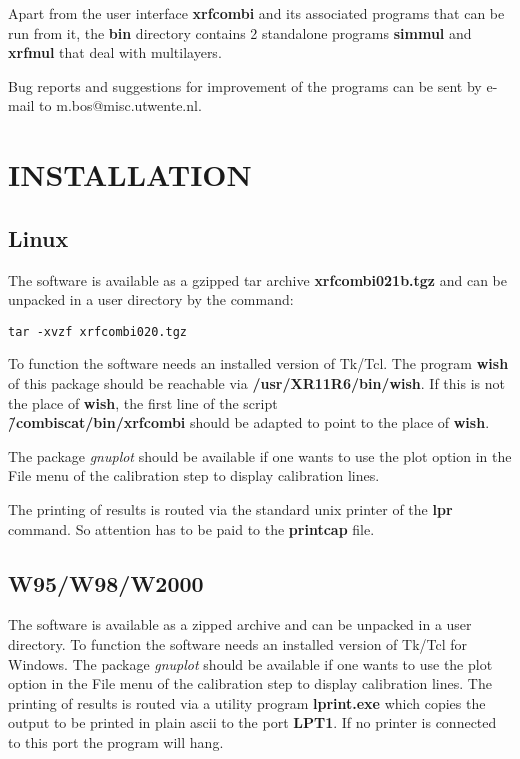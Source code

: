 Apart from the user interface {\bf xrfcombi} and its associated programs
that can be run from it, the {\bf bin} directory contains 2 standalone programs
{\bf simmul} and {\bf xrfmul} that deal with multilayers.

Bug reports and suggestions for improvement of the programs can be sent
by e-mail to m.bos@misc.utwente.nl.

\section{INSTALLATION}
\subsection{Linux}
The software is available as a gzipped tar archive {\bf xrfcombi021b.tgz}
and can be unpacked in  a user directory by the command:
\begin{verbatim}
tar -xvzf xrfcombi020.tgz
\end{verbatim}

To function the software needs an installed version of Tk/Tcl. The program
{\bf wish} of this package should be reachable via {\bf /usr/XR11R6/bin/wish}.
If this is not the place of
{\bf wish}, the first line of the script\\ {\bf \~/combiscat/bin/xrfcombi}
should be adapted to point to the place of {\bf wish}.

The package {\em gnuplot} should be available if one wants to
use the plot option in the File menu of the calibration step
to display calibration lines.

The printing of results is routed via the standard unix printer of
the {\bf lpr} command. So attention has to be paid to the {\bf printcap} file.


\subsection{W95/W98/W2000}
The software is available as a zipped archive and can be unpacked
in a user directory. 
To function the software needs an installed version of Tk/Tcl for Windows.
The package {\em gnuplot} should be available if one wants to
use the plot option in the File menu of the calibration step
to display calibration lines.
The printing of results is routed via a utility program {\bf lprint.exe}
which copies the output to be printed in plain ascii to the port {\bf LPT1}.
If no printer is connected to this port the program will hang.


